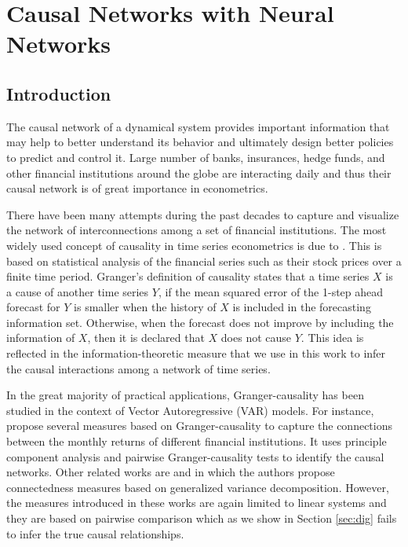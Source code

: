 \chapter{Causal Networks with Neural Networks}

\section{Introduction}\label{S:2.1}

The causal network of a dynamical system provides important information that may help to better understand its behavior and ultimately design better policies to predict and control it. 
Large number of banks, insurances, hedge funds, and other financial institutions around the globe are interacting daily and thus their causal network is of great importance in econometrics.  

There have been many attempts during the past decades to capture and visualize the network of interconnections among a set of financial institutions. 
The most widely used concept of causality in time series econometrics is due to \citet{granger}. 
This is based on statistical analysis of the financial series such as their stock prices over a finite time period. 
Granger’s definition of causality states that a time series $X$ is a cause of another time series $Y$, if the mean squared error of the 1-step ahead forecast for $Y$ is smaller when the history of $X$ is included in the forecasting information set. 
Otherwise, when the forecast does not improve by including the information of $X$, then it is declared that $X$ does not cause $Y$.
This idea is reflected in the information-theoretic measure that we use in this work to infer the causal interactions among a network of time series.  

In the great majority of practical applications, Granger-causality has been studied in the context of Vector Autoregressive (VAR) models. 
For instance, \citet{billio2012econometric} propose several measures  based on Granger-causality to capture the connections between the monthly returns of different financial institutions. 
It uses principle component analysis and pairwise Granger-causality tests to identify the causal networks. 
Other related works are \citet{diebold2014network} and \citet{barigozzi2016network} in which the authors propose connectedness measures based on generalized variance decomposition.
However, the measures introduced in these works are again limited to linear systems and they are based on pairwise comparison which as we show in Section  \ref{sec:dig} fails to infer the true causal relationships.

